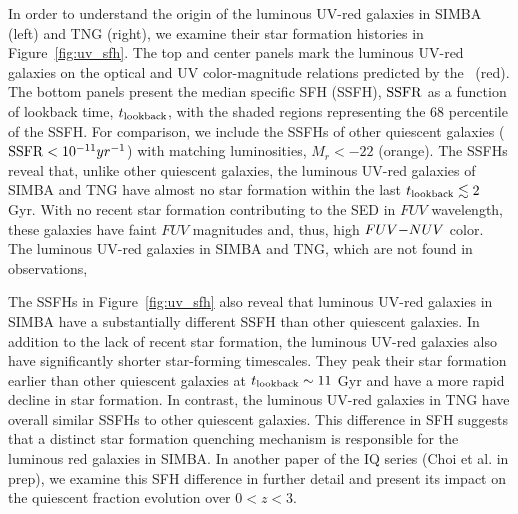 In order to understand the origin of the luminous UV-red galaxies in SIMBA
(left) and TNG (right), we examine their star formation histories in
Figure~\ref{fig:uv_sfh}.
The top and center panels mark the luminous UV-red galaxies on the optical
and UV color-magnitude relations predicted by the \eda~(red). 
The bottom panels present the median specific SFH (SSFH), ${\rm SSFR}$ as a
function of lookback time, $t_{\rm lookback}$, with the shaded regions
representing the 68 percentile of the SSFH.
For comparison, we include the SSFHs of other quiescent galaxies 
(${\rm SSFR} < 10^{-11}yr^{-1}$) with matching luminosities, $M_r < -22$ (orange).
The SSFHs reveal that, unlike other quiescent galaxies, the luminous UV-red
galaxies of SIMBA and TNG have  almost no star formation within the last $t_{\rm lookback} \lesssim 2$ Gyr.
With no recent star formation contributing to the SED in $FUV$ wavelength,
these galaxies have faint $FUV$ magnitudes and, thus, high $FUV{-}NUV$ color.  
The luminous UV-red galaxies in SIMBA and TNG, which are not found in
observations, 

The SSFHs in Figure~\ref{fig:uv_sfh} also reveal that luminous UV-red
galaxies in SIMBA have a substantially different SSFH than other quiescent
galaxies. 
In addition to the lack of recent star formation, the luminous UV-red galaxies
also have significantly shorter star-forming timescales. 
They peak their star formation earlier than other quiescent galaxies at
$t_{\rm lookback}\sim 11$ Gyr and have a more rapid decline in star
formation. 
In contrast, the luminous UV-red galaxies in TNG have overall similar
SSFHs to other quiescent galaxies. 
This difference in SFH suggests that a distinct star formation quenching
mechanism is responsible for the luminous red galaxies in SIMBA. 
In another paper of the IQ series (Choi et al. in prep), we examine this
SFH difference in further detail and present its impact on the quiescent 
fraction evolution over $0 < z < 3$. 


